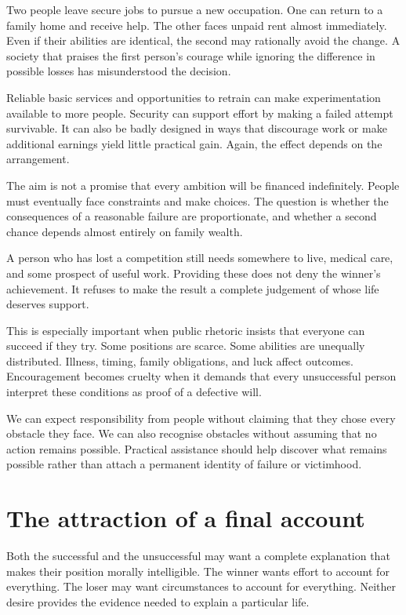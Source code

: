\documentclass[12pt,a4paper]{book}
\begin{document}
Two people leave secure jobs to pursue a new occupation. One can return to a family home and receive help. The other faces unpaid rent almost immediately. Even if their abilities are identical, the second may rationally avoid the change. A society that praises the first person's courage while ignoring the difference in possible losses has misunderstood the decision.

Reliable basic services and opportunities to retrain can make experimentation available to more people. Security can support effort by making a failed attempt survivable. It can also be badly designed in ways that discourage work or make additional earnings yield little practical gain. Again, the effect depends on the arrangement.

The aim is not a promise that every ambition will be financed indefinitely. People must eventually face constraints and make choices. The question is whether the consequences of a reasonable failure are proportionate, and whether a second chance depends almost entirely on family wealth.

A person who has lost a competition still needs somewhere to live, medical care, and some prospect of useful work. Providing these does not deny the winner's achievement. It refuses to make the result a complete judgement of whose life deserves support.

This is especially important when public rhetoric insists that everyone can succeed if they try. Some positions are scarce. Some abilities are unequally distributed. Illness, timing, family obligations, and luck affect outcomes. Encouragement becomes cruelty when it demands that every unsuccessful person interpret these conditions as proof of a defective will.

We can expect responsibility from people without claiming that they chose every obstacle they face. We can also recognise obstacles without assuming that no action remains possible. Practical assistance should help discover what remains possible rather than attach a permanent identity of failure or victimhood.

\section*{The attraction of a final account}

Both the successful and the unsuccessful may want a complete explanation that makes their position morally intelligible. The winner wants effort to account for everything. The loser may want circumstances to account for everything. Neither desire provides the evidence needed to explain a particular life.
\end{document}
